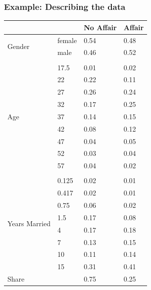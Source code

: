 \documentclass{beamer}
\newcommand{\1}{\mathbb{1}}
\begin{document}
\begin{frame}\frametitle{Example: Describing the data}
{\tiny
\begin{table}[ht]
\centering
\begin{tabular}{llll}
  \toprule 
 & & No Affair & Affair \\ \hline \hline 
 \multirow{2}{*}{Gender} & female & 0.54 & 0.48 \\ 
     & male & 0.46 & 0.52 \\ \\
  \multirow{9}{*}{Age} & 17.5 & 0.01 & 0.02 \\ 
    & 22 & 0.22 & 0.11 \\ 
    & 27 & 0.26 & 0.24 \\ 
    & 32 & 0.17 & 0.25 \\ 
    & 37 & 0.14 & 0.15 \\ 
    & 42 & 0.08 & 0.12 \\ 
    & 47 & 0.04 & 0.05 \\ 
    & 52 & 0.03 & 0.04 \\ 
    & 57 & 0.04 & 0.02 \\ \\
  \multirow{8}{*}{Years Married} & 0.125 & 0.02 & 0.01 \\ 
      & 0.417 & 0.02 & 0.01 \\ 
    & 0.75 & 0.06 & 0.02 \\ 
    & 1.5 & 0.17 & 0.08 \\ 
    & 4 & 0.17 & 0.18 \\ 
    & 7 & 0.13 & 0.15 \\ 
    & 10 & 0.11 & 0.14 \\ 
    & 15 & 0.31 & 0.41 \\ 
  Share &  & 0.75 & 0.25 \\ 
   \bottomrule 
\end{tabular}
\end{table}} 
\end{frame}
\end{document}
